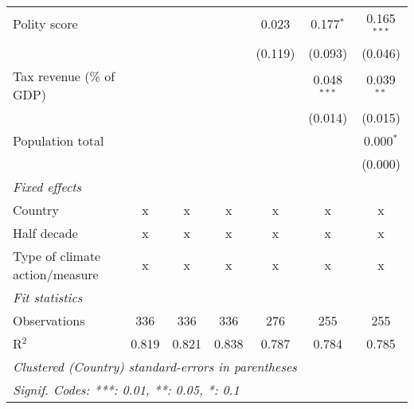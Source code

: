 \begin{tabular}{lcccccc}
   Polity score                                                    &         &         &                & 0.023          & 0.177$^{*}$    & 0.165$^{***}$\\   
                                                                   &         &         &                & (0.119)        & (0.093)        & (0.046)\\   
   Tax revenue (\% of GDP)                                         &         &         &                &                & 0.048$^{***}$  & 0.039$^{**}$\\   
                                                                   &         &         &                &                & (0.014)        & (0.015)\\   
   Population total                                                &         &         &                &                &                & 0.000$^{*}$\\   
                                                                   &         &         &                &                &                & (0.000)\\   
   \emph{Fixed effects}\\
   Country                                                         & x       & x       & x              & x              & x              & x\\  
   Half decade                                                     & x       & x       & x              & x              & x              & x\\  
   Type of climate action/measure                                  & x       & x       & x              & x              & x              & x\\  
   \midrule \emph{Fit statistics}\\
   Observations                                                    & 336     & 336     & 336            & 276            & 255            & 255\\  
   R$^2$                                                           & 0.819   & 0.821   & 0.838          & 0.787          & 0.784          & 0.785\\  
   \midrule
   \multicolumn{7}{l}{\emph{Clustered (Country) standard-errors in parentheses}}\\
   \multicolumn{7}{l}{\emph{Signif. Codes: ***: 0.01, **: 0.05, *: 0.1}}\\
\end{tabular}
\par\endgroup



